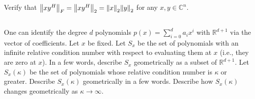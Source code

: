 \documentclass[a4paper]{ctexart}
\newcommand{\pf}{\textbf{\color{pink}{proof:}}}
\begin{document}
\pf

\subsection{}
Verify that $\norm{xy^H}_F = \norm{xy^H}_2 = \norm{x}_2\norm{y}_2$ for
any $x, y \in \mathbb C^n$.

\pf

\subsection{}
One can identify the degree $d$ polynomials $p(x) = \sum_{i=0}^d a_i x^i$ with $\mathbb R^{d+1}$ via the vector of coefficients. 
Let $x$ be ﬁxed. Let $S_x$ be
the set of polynomials with an inﬁnite relative condition number with respect
to evaluating them at $x$ (i.e., they are zero at $x$). In a few words, describe $S_x$
geometrically as a subset of $\mathbb R^{d+1}$. Let $S_x(\kappa)$ be the set of polynomials whose
relative condition number is $\kappa$ or greater. Describe $S_x(\kappa)$ geometrically in a
few words. Describe how $S_x(\kappa)$ changes geometrically as $\kappa \to \infty$.

\pf
\end{document}
